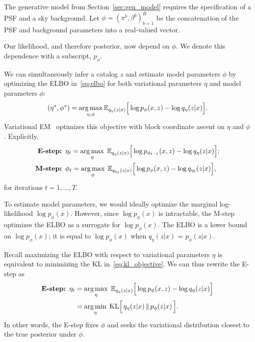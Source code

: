 The generative model from Section~\ref{sec:gen_model} requires
the specification of a PSF and a sky background. Let $\phi = (\pi^b, \beta^b)_{b = 1}^B$ be the concatenation of the PSF and background parameters into a real-valued vector. 

Our likelihood, and therefore posterior, now depend on $\phi$. We denote this dependence with a subscript, $p_\phi$. 

We can simultaneously infer a catalog $z$ and 
estimate model parameters $\phi$ by optimizing 
the ELBO in~\eqref{eq:elbo} for both variational parameters $\eta$ and model parameters $\phi$: 
\begin{align}
(\eta^*, \phi^*) = \operatorname*{arg\,max}_{\eta, \phi} \mathbb{E}_{q_\eta(z | x)}\Big[\log p_\phi(x, z) - \log q_\eta(z | x)\Big].
\label{eq:em_obj}
\end{align}
Variational EM~\cite{Jordan_intro_vi, neal2000varem, Beal2002varem} optimizes this objective with block coordinate ascent on $\eta$ and $\phi$. Explicitly, 
\begin{align}
    \text{{\bf E-step: }} & 
    \eta_{t} = \operatorname*{arg\,max}_{\eta}\; \mathbb{E}_{q_\eta(z | x)}\Big[\log p_{\phi_{t-1}}(x, z) - \log q_\eta(z | x)\Big]; 
    \label{eq:e_step}
    \\
    \text{{\bf M-step: }} & \phi_{t} = \operatorname*{arg\,max}_{\phi}\; \mathbb{E}_{q_{\eta_t}(z | x)}\Big[\log p_{\phi}(x, z) - \log q_{\eta_t}(z | x)\Big],
    \label{eq:m_step}
\end{align}
for iterations $t = 1, ..., T$. 

To estimate model parameters, we would ideally optimize the marginal log-likelihood $\log p_\phi(x)$. However, since $\log p_\phi(x)$ is intractable, the M-step optimizes the ELBO as a surrogate for $\log p_\phi(x)$. The ELBO is a lower bound on 
$\log p_\phi(x)$; it is equal to $\log p_\phi(x)$ when $q_\eta(z | x)$ 
= $p_\phi(z | x)$. 

Recall maximizing the ELBO with respect to variational parameters $\eta$ 
is equivalent to minimizing the KL in~\eqref{eq:kl_objective}.
We can thus rewrite the E-step as 
\begin{align}
    \text{{\bf E-step: }} \eta_{t} &= \operatorname*{arg\,max}_{\eta}\; \mathbb{E}_{q_\eta(z | x)}\Big[\log p_{\phi}(x, z) - \log q_\eta(z | x)\Big]  \label{eq:e_step_kl1} \\
    &= \operatorname*{arg\,min}_{\eta} \; \mathrm{KL}\Big[\,q_\eta(z | x)\, \| \,p_\phi(z | x )\,\Big].  \label{eq:e_step_kl2}
\end{align} 
In other words, the E-step fixes $\phi$ and seeks the variational distribution closest to the true posterior under $\phi$. 


